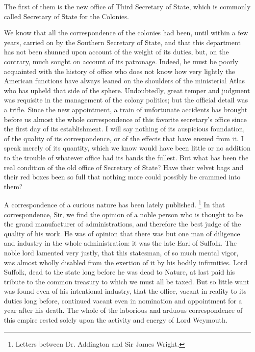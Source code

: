 The first of them is the new office of Third Secretary of State, which is commonly called Secretary of State for the Colonies.

We know that all the correspondence of the colonies had been, until within a few years, carried on by the Southern Secretary of State, and that this department has not been shunned upon account of the weight of its duties, but, on the contrary, much sought on account of its patronage. Indeed, he must be poorly acquainted with the history of office who does not know how very lightly the American functions have always leaned on the shoulders of the ministerial Atlas who has upheld that side of the sphere. Undoubtedly, great temper and judgment was requisite in the management of the colony politics; but the official detail was a trifle. Since the new appointment, a train of unfortunate accidents has brought before us almost the whole correspondence of this favorite secretary's office since the first day of its establishment. I will say nothing of its auspicious foundation, of the quality of its correspondence, or of the effects that have ensued from it. I speak merely of its quantity, which we know would have been little or no addition to the trouble of whatever office had its hands the fullest. But what has been the real condition of the old office of Secretary of State? Have their velvet bags and their red boxes been so full that nothing more could possibly be crammed into them?

A correspondence of a curious nature has been lately published.
\footnote{ Letters between Dr. Addington and Sir James Wright.}
 In that correspondence, Sir, we find the opinion of a noble person who is thought to be the grand manufacturer of administrations, and therefore the best judge of the quality of his work. He was of opinion that there was but one man of diligence and industry in the whole administration: it was the late Earl of Suffolk. The noble lord lamented very justly, that this statesman, of so much mental vigor, was almost wholly disabled from the exertion of it by his bodily infirmities. Lord Suffolk, dead to the state long before he was dead to Nature, at last paid his tribute to the common treasury to which we must all be taxed. But so little want was found even of his intentional industry, that the office, vacant in reality to its duties long before, continued vacant even in nomination and appointment for a year after his death. The whole of the laborious and arduous correspondence of this empire rested solely upon the activity and energy of Lord Weymouth.

